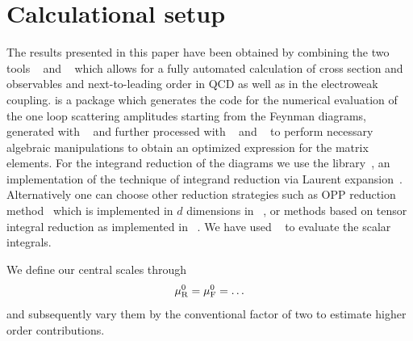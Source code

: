 \section{Calculational setup}
\label{sec:setup}
The results presented in this paper have been obtained by combining the two tools
\GoSam~\cite{Cullen:2011ac,Cullen:2014yla} and \Sherpa~\cite{Gleisberg:2008ta}
which allows for a fully automated calculation of cross section and observables and next-to-leading order in QCD as well
as in the electroweak coupling.
\GoSam is a package which generates the code for the numerical evaluation of
the one loop scattering amplitudes starting from the Feynman diagrams,
generated with \QGraf~\cite{Nogueira:1991ex} and further processed with
\FORM~\cite{Vermaseren:2000nd,Kuipers:2012rf} and
\Spinney~\cite{Cullen:2010jv} to perform necessary algebraic
manipulations to obtain an optimized expression for the matrix elements.
For the integrand reduction of the diagrams we use the \Ninja
library~\cite{Peraro:2014cba}, an implementation of the technique of integrand
reduction via Laurent expansion~\cite{Mastrolia:2012bu,vanDeurzen:2013saa}.
Alternatively one can choose other reduction strategies such as OPP reduction
method~\cite{Ossola:2006us,Mastrolia:2008jb,Ossola:2008xq} which is
implemented in $d$ dimensions in \Samurai~\cite{Mastrolia:2010nb}, or methods based on
tensor integral reduction as implemented in
\GolemNF~\cite{Heinrich:2010ax,Binoth:2008uq,Cullen:2011kv,Guillet:2013msa}.
We have used \OneLoop~\cite{vanHameren:2010cp} to evaluate the scalar integrals.


We define our central scales through
\begin{equation}
  \label{eq:murfdef}
  \begin{split}
    \mu_{\mathrm{R}}^0 = \mu_{\mathrm{F}}^0 = \ldots
  \end{split}
\end{equation}
and subsequently vary them by the conventional factor 
of two to estimate higher order contributions.


